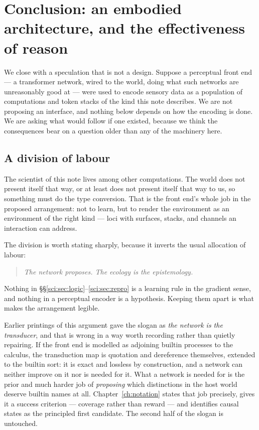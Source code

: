 \section{Conclusion: an embodied architecture, and the effectiveness of reason}\label{sci:S17}
\label{sci:sec:conclusion}

We close with a speculation that is not a design. Suppose a perceptual front end --- a transformer
network, wired to the world, doing what such networks are unreasonably good at --- were used to encode
sensory data as a population of computations and token stacks of the kind this note describes. We are
not proposing an interface, and nothing below depends on how the encoding is done. We are asking what
would follow if one existed, because we think the consequences bear on a question older than any of
the machinery here.

\subsection{A division of labour}\label{sci:S17.1}

The scientist of this note lives among other computations. The world does not present itself that way,
or at least does not present itself that way to us, so something must do the type conversion. That is
the front end's whole job in the proposed arrangement: not to learn, but to render the environment as
an environment of the right kind --- loci with surfaces, stacks, and channels an interaction can
address.

The division is worth stating sharply, because it inverts the usual allocation of labour:

\begin{quote}
\itshape The network proposes. The ecology is the epistemology.
\end{quote}

Nothing in \S\S\ref{sci:sec:logic}--\ref{sci:sec:repro} is a learning rule in the gradient sense, and nothing
in a perceptual encoder is a hypothesis. Keeping them apart is what makes the arrangement legible.

\begin{remark}
\label{sci:rem:transducer}
Earlier printings of this argument gave the slogan as \emph{the network is the transducer}, and that is
wrong in a way worth recording rather than quietly repairing. If the front end is modelled as adjoining
builtin processes to the calculus, the transduction map is quotation and dereference themselves, extended
to the builtin sort: it is exact and lossless by construction, and a network can neither improve on it nor
is needed for it. What a network is needed for is the prior and much harder job of \emph{proposing} which
distinctions in the host world deserve builtin names at all. Chapter~\ref{ch:notation} states that job
precisely, gives it a success criterion --- coverage rather than reward --- and identifies causal states as
the principled first candidate. The second half of the slogan is untouched.
\end{remark}

